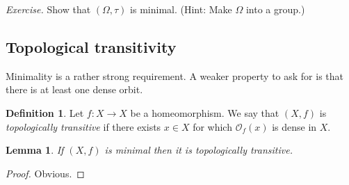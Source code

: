 \documentclass[12pt]{article}
\newtheorem{lemma}[theorem]{Lemma}
\newtheorem{proposition}[theorem]{Proposition}
\theoremstyle{definition}
\newtheorem{definition}[theorem]{Definition}
\theoremstyle{remark}
\begin{document}
\noindent
{\it Exercise.}
Show that $(\Omega,\tau)$ is minimal. (Hint: Make $\Omega$ into a group.)









%















\subsection{Topological transitivity}

Minimality is a rather strong requirement. A weaker property to ask for is that there is at least one dense orbit.

\begin{definition}
Let $f : X \to X$ be a homeomorphism.
We say that $(X,f)$ is {\it topologically transitive} if there exists $x \in X$ for which $\mathcal O_f(x)$ 
is dense in $X$.
\end{definition}

\begin{lemma}
If $(X,f)$ is minimal then it is topologically transitive.
\end{lemma}

\begin{proof}
Obvious.
\end{proof}
\end{document}
